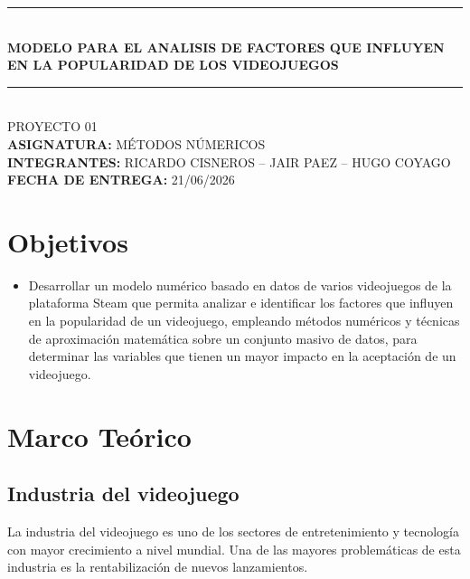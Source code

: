 \documentclass[12pt]{report}
\begin{document}
\thispagestyle{empty}
\vspace*{2cm}
\begin{center}
    \noindent\rule{\textwidth}{0.4pt}\\[0.5cm]
    {\Huge\bfseries MODELO PARA EL ANALISIS DE FACTORES QUE INFLUYEN EN LA POPULARIDAD DE LOS VIDEOJUEGOS}\\[0.5cm]
    \noindent\rule{\textwidth}{0.4pt}\\[0.5cm]
    {\large PROYECTO 01}\\[2cm]
    \textbf{ASIGNATURA:} \hspace{1cm} MÉTODOS NÚMERICOS\\[0.2cm]
    
    \textbf{INTEGRANTES:} \hspace{1cm} RICARDO CISNEROS -- JAIR PAEZ -- HUGO COYAGO\\[2cm]
    
    \textbf{FECHA DE ENTREGA:} \hspace{0.5cm} 21/06/2026
\end{center}
\newpage


\tableofcontents
\thispagestyle{empty}
\newpage

\setcounter{page}{1}

\section*{Objetivos} 
\begin{itemize}
    \item Desarrollar un modelo numérico basado en datos de varios videojuegos de la plataforma Steam que permita analizar e identificar los factores que influyen en la popularidad de un videojuego, empleando métodos numéricos y técnicas de aproximación matemática sobre un conjunto masivo de datos, para determinar las variables que tienen un mayor impacto en la aceptación de un videojuego.
\end{itemize}

\section*{Marco Teórico}

\subsection*{Industria del videojuego}
La industria del videojuego es uno de los sectores de entretenimiento y tecnología con mayor crecimiento a nivel mundial. Una de las mayores problemáticas de esta industria es la rentabilización de nuevos lanzamientos.
\end{document}
